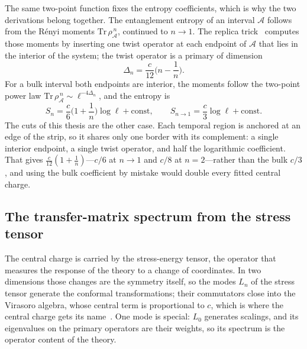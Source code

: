 The same two-point function fixes the entropy coefficients, which is why the two derivations belong together. The entanglement entropy of an interval $\mathcal A$ follows from the R\'enyi moments $\mathrm{Tr}\,\rho_{\mathcal A}^{\,n}$, continued to $n\to1$. The replica trick~\cite{calabrese_cardy2004} computes those moments by inserting one twist operator at each endpoint of $\mathcal A$ that lies in the interior of the system; the twist operator is a primary of dimension~\cite{calabrese_cardy2004}
\begin{equation}
    \Delta_n = \frac{c}{12}\Big(n - \frac{1}{n}\Big).
    \label{eq:cft:twist}
\end{equation}
For a bulk interval both endpoints are interior, the moments follow the two-point power law $\mathrm{Tr}\,\rho_{\mathcal A}^{\,n}\sim\ell^{-4\Delta_n}$, and the entropy is
\begin{equation}
    S_n = \frac{c}{6}\Big(1+\frac1n\Big)\log\ell + \text{const},
    \qquad
    S_{n\to1} = \frac{c}{3}\log\ell + \text{const}.
    \label{eq:cft:cc}
\end{equation}
The cuts of this thesis are the other case. Each temporal region is anchored at an edge of the strip, so it shares only one border with its complement: a single interior endpoint, a single twist operator, and half the logarithmic coefficient. That gives $\tfrac{c}{12}(1+\tfrac1n)$---$c/6$ at $n\to1$ and $c/8$ at $n=2$---rather than the bulk $c/3$, and using the bulk coefficient by mistake would double every fitted central charge.




\subsection{The transfer-matrix spectrum from the stress tensor}
\label{app:cft:spectrum}

The central charge is carried by the stress-energy tensor, the operator that measures the response of the theory to a change of coordinates. In two dimensions those changes are the symmetry itself, so the modes $L_n$ of the stress tensor generate the conformal transformations; their commutators close into the Virasoro algebra, whose central term is proportional to $c$, which is where the central charge gets its name~\cite{difrancesco1997}. One mode is special: $L_0$ generates scalings, and its eigenvalues on the primary operators are their weights, so its spectrum is the operator content of the theory.

